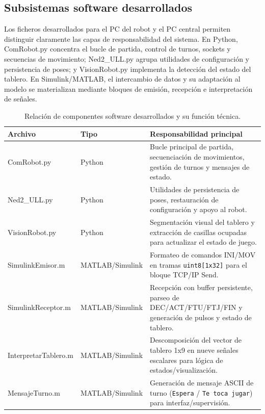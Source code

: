 \documentclass[12pt,a4paper]{article}
\begin{document}
\subsection{Subsistemas software desarrollados}
Los ficheros desarrollados para el PC del robot y el PC central permiten distinguir claramente las capas de responsabilidad del sistema. En Python, ComRobot.py concentra el bucle de partida, control de turnos, sockets y secuencias de movimiento; Ned2\_ULL.py agrupa utilidades de configuraci\'on y persistencia de poses; y VisionRobot.py implementa la detecci\'on del estado del tablero. En Simulink/MATLAB, el intercambio de datos y su adaptaci\'on al modelo se materializan mediante bloques de emisi\'on, recepci\'on e interpretaci\'on de se\~nales.

\begin{table}[H]
\centering
\footnotesize
\begin{tabular}{P{0.22\textwidth} P{0.20\textwidth} P{0.48\textwidth}}
\toprule
\textbf{Archivo} & \textbf{Tipo} & \textbf{Responsabilidad principal} \\
\midrule
ComRobot.py & Python & Bucle principal de partida, secuenciaci\'on de movimientos, gesti\'on de turnos y mensajes de estado. \\
Ned2\_ULL.py & Python & Utilidades de persistencia de poses, restauraci\'on de configuraci\'on y apoyo al robot. \\
VisionRobot.py & Python & Segmentaci\'on visual del tablero y extracci\'on de casillas ocupadas para actualizar el estado de juego. \\
SimulinkEmisor.m & MATLAB/Simulink & Formateo de comandos INI/MOV en tramas \texttt{uint8[1x32]} para el bloque TCP/IP Send. \\
SimulinkReceptor.m & MATLAB/Simulink & Recepci\'on con buffer persistente, parseo de DEC/ACT/FTU/FTJ/FIN y generaci\'on de pulsos y estado de tablero. \\
InterpretarTablero.m & MATLAB/Simulink & Descomposici\'on del vector de tablero 1x9 en nueve se\~nales escalares para l\'ogica de estados/visualizaci\'on. \\
MensajeTurno.m & MATLAB/Simulink & Generaci\'on de mensaje ASCII de turno (\texttt{Espera} / \texttt{Te toca jugar}) para interfaz/supervisi\'on. \\
\bottomrule
\end{tabular}
\caption{Relaci\'on de componentes software desarrollados y su funci\'on t\'ecnica.}
\end{table}
\end{document}

